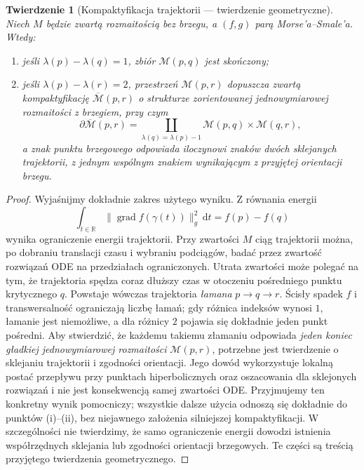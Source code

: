 \documentclass[11pt,a4paper,oneside]{report}
\newcommand{\R}{\mathbb{R}}
\newcommand{\dd}{\mathrm d}
\theoremstyle{plain}
\newtheorem{twierdzenie}{Twierdzenie}[section]
\theoremstyle{definition}
\theoremstyle{remark}
\begin{document}
\begin{twierdzenie}[Kompaktyfikacja trajektorii — twierdzenie geometryczne]
\label{thm:morse-compact-v10}
Niech $M$ będzie zwartą rozmaitością bez brzegu,
a $(f,g)$ parą Morse'a--Smale'a. Wtedy:
\begin{enumerate}[label=(\roman*)]
\item jeśli $\lambda(p)-\lambda(q)=1$, zbiór $\mathcal M(p,q)$
      jest skończony;
\item jeśli $\lambda(p)-\lambda(r)=2$, przestrzeń
      $\mathcal M(p,r)$ dopuszcza zwartą kompaktyfikację
      $\overline{\mathcal M}(p,r)$ o strukturze zorientowanej
      jednowymiarowej rozmaitości z brzegiem, przy czym
      \[
       \partial\overline{\mathcal M}(p,r)=
       \coprod_{\lambda(q)=\lambda(p)-1}
       \mathcal M(p,q)\times\mathcal M(q,r),
      \]
      a znak punktu brzegowego odpowiada iloczynowi znaków
      dwóch sklejanych trajektorii, z jednym wspólnym znakiem
      wynikającym z przyjętej orientacji brzegu.
\end{enumerate}
\end{twierdzenie}
\begin{proof}
Wyjaśnijmy dokładnie zakres użytego wyniku. Z równania energii
\[
\int_{t\in\R}\|\operatorname{grad}f(\gamma(t))\|_g^2\,\dd t
=f(p)-f(q)
\]
wynika ograniczenie energii trajektorii.
Przy zwartości $M$ ciąg trajektorii można, po dobraniu translacji
czasu i wybraniu podciągów, badać przez zwartość rozwiązań ODE
na przedziałach ograniczonych. Utrata zwartości może polegać na tym,
że trajektoria spędza coraz dłuższy czas w otoczeniu pośredniego
punktu krytycznego $q$. Powstaje wówczas trajektoria
\emph{łamana} $p\to q\to r$. Ścisły spadek $f$
i transwersalność ograniczają liczbę łamań; gdy różnica
indeksów wynosi $1$, łamanie jest niemożliwe, a dla różnicy
$2$ pojawia się dokładnie jeden punkt pośredni.
Aby stwierdzić, że każdemu takiemu złamaniu odpowiada
\emph{jeden koniec gładkiej jednowymiarowej rozmaitości}
$\mathcal M(p,r)$, potrzebne jest twierdzenie o sklejaniu
trajektorii i zgodności orientacji. Jego dowód wykorzystuje
lokalną postać przepływu przy punktach hiperbolicznych
oraz oszacowania dla sklejonych rozwiązań i nie jest
konsekwencją samej zwartości ODE. Przyjmujemy ten
konkretny wynik pomocniczy; wszystkie dalsze użycia
odnoszą się dokładnie do punktów (i)--(ii), bez
niejawnego założenia silniejszej kompaktyfikacji.
W szczególności nie twierdzimy, że samo ograniczenie energii
dowodzi istnienia współrzędnych sklejania lub zgodności
orientacji brzegowych. Te części są treścią przyjętego
twierdzenia geometrycznego.
\end{proof}
\end{document}
